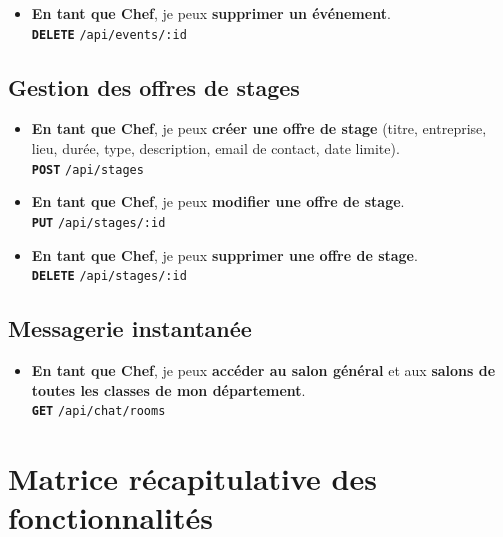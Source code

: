 \documentclass[12pt,a4paper]{article}
\newcommand{\route}[1]{\texorpdfstring{\texttt{\small\color{routeGray}#1}}{#1}}
\newcommand{\httpmethod}[1]{%
  \ifstrequal{#1}{GET}{\colorbox{blue!15}{\texttt{\bfseries\color{blue!70!black}GET}}}{}%
  \ifstrequal{#1}{POST}{\colorbox{green!18}{\texttt{\bfseries\color{green!60!black}POST}}}{}%
  \ifstrequal{#1}{PUT}{\colorbox{orange!18}{\texttt{\bfseries\color{orange!70!black}PUT}}}{}%
  \ifstrequal{#1}{DELETE}{\colorbox{red!15}{\texttt{\bfseries\color{red!70!black}DELETE}}}{}%
}
\newcommand{\usmark}{\color{accentGold}$\blacktriangleright$\;}
\begin{document}
\begin{chefbox}
\begin{itemize}[leftmargin=1.2cm, labelsep=0.4cm]
  \item[\usmark] \textbf{En tant que Chef}, je peux \textbf{supprimer un événement}.\\
    \httpmethod{DELETE} \route{/api/events/:id}
\end{itemize}

\subsection*{Gestion des offres de stages}

\begin{itemize}[leftmargin=1.2cm, labelsep=0.4cm]
  \item[\usmark] \textbf{En tant que Chef}, je peux \textbf{créer une offre de stage} (titre, entreprise, lieu, durée, type, description, email de contact, date limite).\\
    \httpmethod{POST} \route{/api/stages}

  \item[\usmark] \textbf{En tant que Chef}, je peux \textbf{modifier une offre de stage}.\\
    \httpmethod{PUT} \route{/api/stages/:id}

  \item[\usmark] \textbf{En tant que Chef}, je peux \textbf{supprimer une offre de stage}.\\
    \httpmethod{DELETE} \route{/api/stages/:id}
\end{itemize}

\subsection*{Messagerie instantanée}

\begin{itemize}[leftmargin=1.2cm, labelsep=0.4cm]
  \item[\usmark] \textbf{En tant que Chef}, je peux \textbf{accéder au salon général} et aux \textbf{salons de toutes les classes de mon département}.\\
    \httpmethod{GET} \route{/api/chat/rooms}
\end{itemize}

\end{chefbox}

\newpage

\section{Matrice récapitulative des fonctionnalités}
\end{document}
